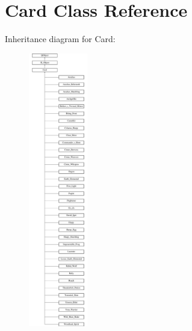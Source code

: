 \hypertarget{class_card}{}\section{Card Class Reference}
\label{class_card}
Inheritance diagram for Card\+:\begin{figure}[H]
\begin{center}
\leavevmode
\includegraphics[height=12.000000cm]{class_card}
\end{center}
\end{figure}
